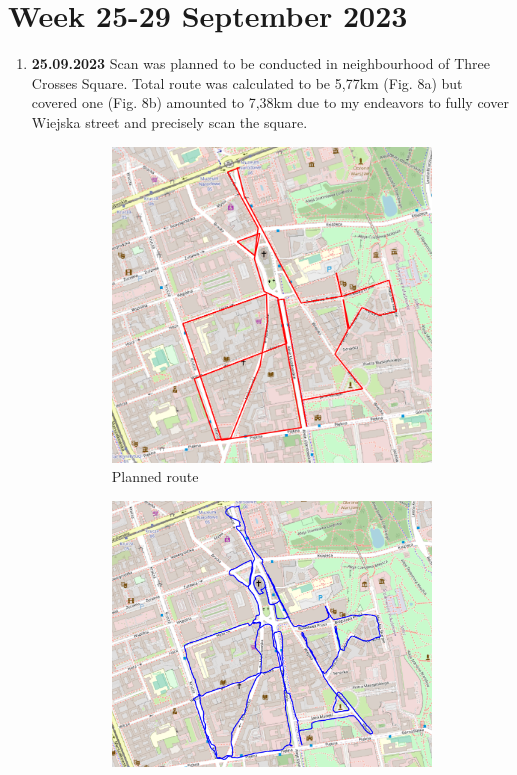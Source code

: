 \documentclass[a4paper,12pt]{article}
\begin{document}
\section{Week 25-29 September 2023} 
\begin{enumerate}
	\item \textbf{25.09.2023} Scan was planned to be conducted in neighbourhood of Three Crosses Square. Total route was calculated to be 5,77km (Fig. 8a) but covered one (Fig. 8b) amounted to 7,38km due to my endeavors to fully cover Wiejska street and precisely scan the square.
	\begin{figure}[H]
		\centering
		\begin{subfigure}{.75\textwidth}
			\centering
			\includegraphics[width=1\linewidth]{route_p7}
			\caption{Planned route}
			\label{fig:a7}
		\end{subfigure}%
		\linebreak
		\begin{subfigure}{.75\textwidth}
			\centering
			\includegraphics[width=1\linewidth]{route_c7}

\end{subfigure}
\end{figure}
\end{enumerate}
\end{document}
